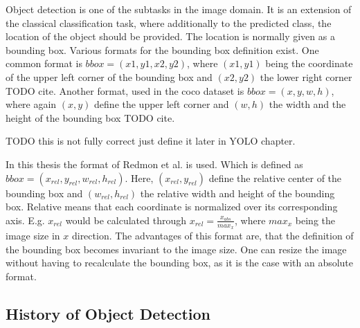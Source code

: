 Object detection is one of the subtasks in the image domain.
It is an extension of the classical classification task, where additionally to the predicted class, the location of the object should be provided.
The location is normally given as a bounding box.
Various formats for the bounding box definition exist.
One common format is $bbox = (x1, y1, x2, y2)$, where $(x1, y1)$ being the coordinate of the upper left corner of the bounding box and $(x2, y2)$ the lower right corner TODO cite.
Another format, used in the coco dataset is $bbox = (x, y, w, h)$, where again $(x, y)$ define the upper left corner and $(w, h)$ the width and the height of the bounding box TODO cite.

TODO this is not fully correct just define it later in YOLO chapter.

In this thesis the format of Redmon et al. \cite{yolov1} is used.
Which is defined as $bbox = (x_{rel}, y_{rel}, w_{rel}, h_{rel})$.
Here, $(x_{rel}, y_{rel})$ define the relative center of the bounding box and $(w_{rel}, h_{rel})$ the relative width and height of the bounding box.
Relative means that each coordinate is normalized over its corresponding axis.
E.g. $x_{rel}$ would be calculated through $x_{rel} = \frac{x_{abs}}{max_x}$, where $max_x$ being the image size in $x$ direction.
The advantages of this format are, that the definition of the bounding box becomes invariant to the image size.
One can resize the image without having to recalculate the bounding box, as it is the case with an absolute format.

\subsection{History of Object Detection}
\label{sec:hostory_obj_detection}


